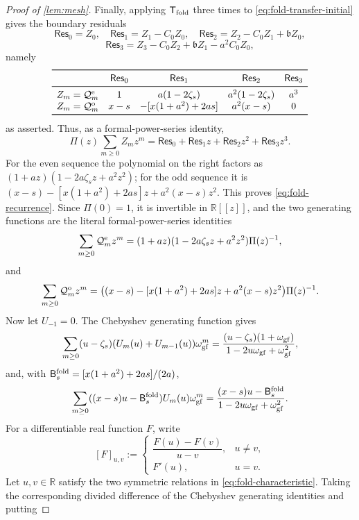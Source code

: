 \documentclass[review,hidelinks,onefignum,onetabnum]{siamart251216}
\begin{document}
\begin{proof}[Proof of \cref{lem:mesh}]
Finally, applying \(\mathsf T_{\rm fold}\) three times to
\eqref{eq:fold-transfer-initial} gives the boundary residuals
\[
 \mathsf{Res}_0=Z_0,\quad
 \mathsf{Res}_1=Z_1-C_0Z_0,\quad
 \mathsf{Res}_2=Z_2-C_0Z_1+\mathfrak bZ_0,
\]
\[
 \mathsf{Res}_3
 =Z_3-C_0Z_2+\mathfrak bZ_1-a^2C_0Z_0,
\]
namely
\[
\begin{array}{ccccc}
 \toprule
 &\mathsf{Res}_0&\mathsf{Res}_1&\mathsf{Res}_2&\mathsf{Res}_3\\ \midrule
 Z_m=\mathcal Q_m^{\rm e}
 &1&a(1-2\zeta_s)&a^2(1-2\zeta_s)&a^3\\
 Z_m=\mathcal Q_m^{\rm o}
 &x-s&-[x(1+a^2)+2as]&a^2(x-s)&0\\
 \bottomrule
\end{array}
\]
as asserted.
Thus, as a formal-power-series identity,
\[
 \Pi(z)\sum_{m\geq0}Z_mz^m
 =\mathsf{Res}_0+\mathsf{Res}_1z+\mathsf{Res}_2z^2+\mathsf{Res}_3z^3.
\]
For the even sequence the polynomial on the right factors as
\((1+az)(1-2a\zeta_sz+a^2z^2)\); for the odd sequence it is
\((x-s)-[x(1+a^2)+2as]z+a^2(x-s)z^2\).  This proves
\eqref{eq:fold-recurrence}.  Since \(\Pi(0)=1\), it is invertible in
\(\mathbb R[[z]]\), and the two generating functions are the literal
formal-power-series identities
\begin{equation}\label{eq:fold-generating-even}
 \sum_{m\geq0}\mathcal Q_m^{\rm e}z^m
 =(1+az)(1-2a\zeta_sz+a^2z^2)\Pi(z)^{-1},
\end{equation}
and
\begin{equation}\label{eq:fold-generating-odd}
 \sum_{m\geq0}\mathcal Q_m^{\rm o}z^m
 =\bigl((x-s)-[x(1+a^2)+2as]z+a^2(x-s)z^2\bigr)
  \Pi(z)^{-1}.
\end{equation}
Now let \(U_{-1}=0\).  The Chebyshev generating function gives
\[
 \sum_{m\geq0}(u-\zeta_s)(U_m(u)+U_{m-1}(u))\omega_{\rm gf}^m
 =\frac{(u-\zeta_s)(1+\omega_{\rm gf})}
 {1-2u\omega_{\rm gf}+\omega_{\rm gf}^2},
\]
and, with \(\mathsf B_s^{\rm fold}=[x(1+a^2)+2as]/(2a)\),
\[
 \sum_{m\geq0}((x-s)u-\mathsf B_s^{\rm fold})U_m(u)\omega_{\rm gf}^m
 =\frac{(x-s)u-\mathsf B_s^{\rm fold}}
 {1-2u\omega_{\rm gf}+\omega_{\rm gf}^2}.
\]
For a differentiable real function \(F\), write
\[
 [F]_{u,v}:=
 \begin{cases}
  \dfrac{F(u)-F(v)}{u-v},&u\neq v,\\[2mm]
  F'(u),&u=v.
 \end{cases}
\]
Let \(u,v\in\mathbb R\) satisfy the two symmetric relations in
\eqref{eq:fold-characteristic}.  Taking the corresponding divided
difference of the Chebyshev generating identities and putting

\end{proof}
\end{document}
